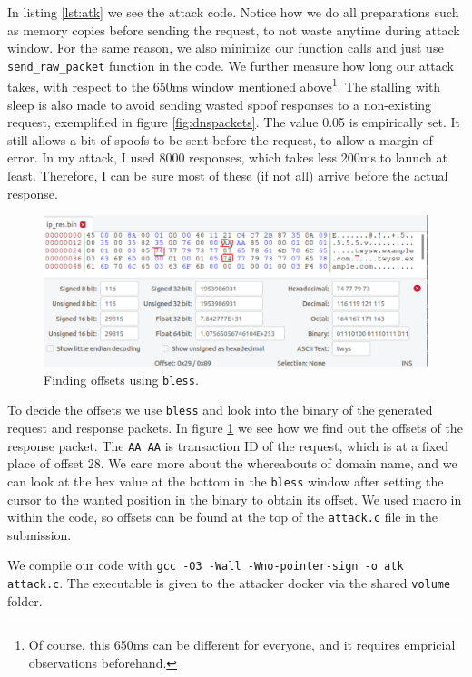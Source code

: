 \documentclass[12pt,reqno]{amsart}
\newcommand{\code}[1]{\texttt{#1}}
\begin{document}
In listing \ref{lst:atk} we see the attack code. Notice how we do all preparations such as memory copies before sending the request, to not waste anytime during attack window. For the same reason, we also minimize our function calls and just use \code{send\_raw\_packet} function in the code. We further measure how long our attack takes, with respect to the 650ms window mentioned above\footnote{Of course, this 650ms can be different for everyone, and it requires empricial observations beforehand.}. The stalling with sleep is also made to avoid sending wasted spoof responses to a non-existing request, exemplified in figure \ref{fig:dnspackets}. The value 0.05 is empirically set. It still allows a bit of spoofs to be sent before the request, to allow a margin of error. In my attack, I used 8000 responses, which takes less 200ms to launch at least. Therefore, I can be sure most of these (if not all) arrive before the actual response.

\begin{figure}[h]
  \includegraphics[width=\linewidth]{img/offsets.png}
  \caption{Finding offsets using \code{bless}.}
  \label{fig:offsets}
\end{figure}

To decide the offsets we use \code{bless} and look into the binary of the generated request and response packets. In figure \ref{fig:offsets} we see how we find out the offsets of the response packet. The \code{AA AA} is transaction ID of the request, which is at a fixed place of offset 28. We care more about the whereabouts of domain name, and we can look at the hex value at the bottom in the \code{bless} window after setting the cursor to the wanted position in the binary to obtain its offset. We used macro in within the code, so offsets can be found at the top of the \code{attack.c} file in the submission.

We compile our code with \code{gcc -O3 -Wall -Wno-pointer-sign -o atk attack.c}. The executable is given to the attacker docker via the shared \code{volume} folder. 
\end{document}

